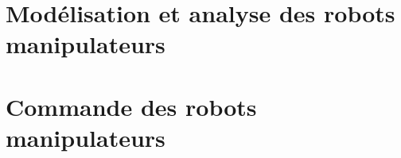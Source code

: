 \documentclass[letterpaper,oneside,french]{book}
\begin{document}

\setcounter{tocdepth}{1}\noptcrule
{\hypersetup{linkcolor=black}
\doparttoc[n]
\tableofcontents
\newpage
}


% 

\part{Modélisation et analyse des robots manipulateurs}
\label{sec:manip}









\part{Commande des robots manipulateurs}
\label{sec:manip_control}




% 

\end{document}

